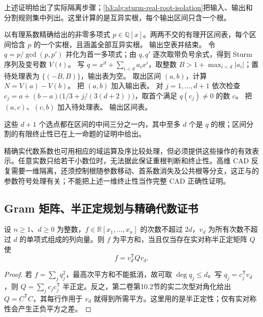 上述证明给出了实际隔离步骤；\cref{b3:alg:sturm-real-root-isolation}把输入、输出和分割规则集中列出。这里计算的是互异实根，每个输出区间只含一个根。

\begin{algorithm}[htbp]
	\caption{Sturm 实根隔离}
	\label{b3:alg:sturm-real-root-isolation}
	\begin{algorithmsteps}{以有理系数精确给出的非零多项式 \(p\in\mathbb Q[x]\)。}{两两不交的有理开区间表，每个区间恰含 \(p\) 的一个实根，且涵盖全部互异实根。}
			\State 输出空表并结束。
		\EndIf
		\State 令 \(q=p/\gcd(p,p')\) 并化为首一多项式；由 \(q,q'\) 逐次取带负号余式，得到 Sturm 序列及变号数 \(V(t)\)。
		\State 写 \(q=x^d+\sum_{i<d}a_ix^i\)，取整数 \(B>1+\max_{i<d}|a_i|\)；置待处理表为 \(\{(-B,B)\}\)，输出表为空。
			\State 取出区间 \((a,b)\)，计算 \(N=V(a)-V(b)\)。
				\State 把 \((a,b)\) 加入输出表。
			\EndIf
				\State 对 \(j=1,\ldots,d+1\) 依次检查 \(c_j=a+(b-a)\bigl(1/3+j/(3(d+2))\bigr)\)，取首个满足 \(q(c_j)\ne0\) 的数 \(c\)。
				\State 把 \((a,c)\)、\((c,b)\) 加入待处理表。
			\EndIf
		\EndWhile
		\State 输出区间表。
	\end{algorithmsteps}
\end{algorithm}

这些 \(d+1\) 个选点都在区间的中间三分之一内，其中至多 \(d\) 个是 \(q\) 的根；区间分割的有限终止性已在上一命题的证明中给出。

精确实代数系数也可用相应的域运算及序比较处理，但必须提供这些操作的有效表示。任意实数只给若干小数位时，无法据此保证重根判断和终止性。高维 CAD 反复需要一维隔离，还须控制根随参数移动、首系数消失及公共根等分支，这正与的参数符号处理有关；不能把上述一维终止性当作完整 CAD 正确性证明。

\subsection{Gram 矩阵、半正定规划与精确代数证书}
\label{b3:subsec:G05:02}

\begin{proposition}\label{b3:prop:sos-gram-matrix}
	设 \(n\ge1\)、\(d\ge0\) 为整数，\(f\in\mathbb R[x_1,\ldots,x_n]\) 的次数不超过 \(2d\)，\(v_d\) 为所有次数不超过 \(d\) 的单项式组成的列向量。则 \(f\) 为平方和，当且仅当存在实对称半正定矩阵 \(Q\) 使
	\[
		f=v_d^{\mathsf T}Qv_d.
	\]
\end{proposition}
\begin{proof}
	若 \(f=\sum_jq_j^2\)，最高次平方和不能抵消，故可取 \(\deg q_j\le d\)。写 \(q_j=c_j^{\mathsf T}v_d\)，则 \(Q=\sum_jc_jc_j^{\mathsf T}\) 半正定。反之，第二卷第10.2节的实二次型对角化给出 \(Q=C^{\mathsf T}C\)，其每行作用于 \(v_d\) 就得到所需平方。这里用的是半正定性；仅有实对称性会产生正负平方之差。
\end{proof}

